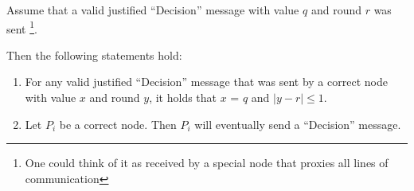 \begin{lem}
  \label{lem-decision-shift}
  Assume that a valid justified ``Decision'' message with value $q$ and round
  $r$ was sent \footnote{One could think of it as received by a special node
  that proxies all lines of communication}. 
  
  Then the following statements hold:
  \begin{enumerate}
    \item For any valid justified ``Decision'' message that was sent by a
      correct node with value $x$ and round $y$, it holds that $x$ = $q$ and
      $|y - r| \leq 1$. 
    \item Let $P_i$ be a correct node. Then $P_i$ will eventually send a
      ``Decision'' message.
  \end{enumerate}
\end{lem}
